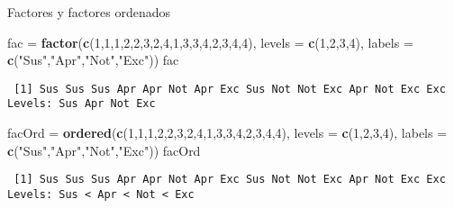 \documentclass[
  ignorenonframetext,
]{beamer}
\newenvironment{Shaded}{\begin{snugshade}}{\end{snugshade}}
\newcommand{\DataTypeTok}[1]{\textcolor[rgb]{0.13,0.29,0.53}{#1}}
\newcommand{\DecValTok}[1]{\textcolor[rgb]{0.00,0.00,0.81}{#1}}
\newcommand{\KeywordTok}[1]{\textcolor[rgb]{0.13,0.29,0.53}{\textbf{#1}}}
\newcommand{\NormalTok}[1]{#1}
\newcommand{\StringTok}[1]{\textcolor[rgb]{0.31,0.60,0.02}{#1}}
\begin{document}
\begin{frame}[fragile]{Factores y factores ordenados}
\protect\hypertarget{factores-y-factores-ordenados}{}

\begin{Shaded}
\begin{Highlighting}[]
\NormalTok{fac =}\StringTok{ }\KeywordTok{factor}\NormalTok{(}\KeywordTok{c}\NormalTok{(}\DecValTok{1}\NormalTok{,}\DecValTok{1}\NormalTok{,}\DecValTok{1}\NormalTok{,}\DecValTok{2}\NormalTok{,}\DecValTok{2}\NormalTok{,}\DecValTok{3}\NormalTok{,}\DecValTok{2}\NormalTok{,}\DecValTok{4}\NormalTok{,}\DecValTok{1}\NormalTok{,}\DecValTok{3}\NormalTok{,}\DecValTok{3}\NormalTok{,}\DecValTok{4}\NormalTok{,}\DecValTok{2}\NormalTok{,}\DecValTok{3}\NormalTok{,}\DecValTok{4}\NormalTok{,}\DecValTok{4}\NormalTok{), }
       \DataTypeTok{levels =} \KeywordTok{c}\NormalTok{(}\DecValTok{1}\NormalTok{,}\DecValTok{2}\NormalTok{,}\DecValTok{3}\NormalTok{,}\DecValTok{4}\NormalTok{), }\DataTypeTok{labels =} \KeywordTok{c}\NormalTok{(}\StringTok{"Sus"}\NormalTok{,}\StringTok{"Apr"}\NormalTok{,}\StringTok{"Not"}\NormalTok{,}\StringTok{"Exc"}\NormalTok{))}
\NormalTok{fac}
\end{Highlighting}
\end{Shaded}

\begin{verbatim}
 [1] Sus Sus Sus Apr Apr Not Apr Exc Sus Not Not Exc Apr Not Exc Exc
Levels: Sus Apr Not Exc
\end{verbatim}

\begin{Shaded}
\begin{Highlighting}[]
\NormalTok{facOrd =}\StringTok{ }\KeywordTok{ordered}\NormalTok{(}\KeywordTok{c}\NormalTok{(}\DecValTok{1}\NormalTok{,}\DecValTok{1}\NormalTok{,}\DecValTok{1}\NormalTok{,}\DecValTok{2}\NormalTok{,}\DecValTok{2}\NormalTok{,}\DecValTok{3}\NormalTok{,}\DecValTok{2}\NormalTok{,}\DecValTok{4}\NormalTok{,}\DecValTok{1}\NormalTok{,}\DecValTok{3}\NormalTok{,}\DecValTok{3}\NormalTok{,}\DecValTok{4}\NormalTok{,}\DecValTok{2}\NormalTok{,}\DecValTok{3}\NormalTok{,}\DecValTok{4}\NormalTok{,}\DecValTok{4}\NormalTok{), }
       \DataTypeTok{levels =} \KeywordTok{c}\NormalTok{(}\DecValTok{1}\NormalTok{,}\DecValTok{2}\NormalTok{,}\DecValTok{3}\NormalTok{,}\DecValTok{4}\NormalTok{), }\DataTypeTok{labels =} \KeywordTok{c}\NormalTok{(}\StringTok{"Sus"}\NormalTok{,}\StringTok{"Apr"}\NormalTok{,}\StringTok{"Not"}\NormalTok{,}\StringTok{"Exc"}\NormalTok{))}
\NormalTok{facOrd}
\end{Highlighting}
\end{Shaded}

\begin{verbatim}
 [1] Sus Sus Sus Apr Apr Not Apr Exc Sus Not Not Exc Apr Not Exc Exc
Levels: Sus < Apr < Not < Exc
\end{verbatim}

\end{frame}
\end{document}
